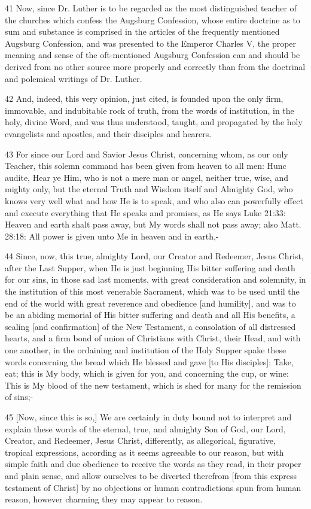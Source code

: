 41 Now, since Dr. Luther is to be regarded as the most distinguished teacher of the churches which confess the Augsburg Confession, whose entire doctrine as to sum and substance is comprised in the articles of the frequently mentioned Augsburg Confession, and was presented to the Emperor Charles V, the proper meaning and sense of the oft-mentioned Augsburg Confession can and should be derived from no other source more properly and correctly than from the doctrinal and polemical writings of Dr. Luther.

42 And, indeed, this very opinion, just cited, is founded upon the only firm, immovable, and indubitable rock of truth, from the words of institution, in the holy, divine Word, and was thus understood, taught, and propagated by the holy evangelists and apostles, and their disciples and hearers.

43 For since our Lord and Savior Jesus Christ, concerning whom, as our only Teacher, this solemn command has been given from heaven to all men: Hunc audite, Hear ye Him, who is not a mere man or angel, neither true, wise, and mighty only, but the eternal Truth and Wisdom itself and Almighty God, who knows very well what and how He is to speak, and who also can powerfully effect and execute everything that He speaks and promises, as He says Luke 21:33: Heaven and earth shalt pass away, but My words shall not pass away; also Matt. 28:18: All power is given unto Me in heaven and in earth,-

44 Since, now, this true, almighty Lord, our Creator and Redeemer, Jesus Christ, after the Last Supper, when He is just beginning His bitter suffering and death for our sins, in those sad last moments, with great consideration and solemnity, in the institution of this most venerable Sacrament, which was to be used until the end of the world with great reverence and obedience [and humility], and was to be an abiding memorial of His bitter suffering and death and all His benefits, a sealing [and confirmation] of the New Testament, a consolation of all distressed hearts, and a firm bond of union of Christians with Christ, their Head, and with one another, in the ordaining and institution of the Holy Supper spake these words concerning the bread which He blessed and gave [to His disciples]: Take, eat; this is My body, which is given for you, and concerning the cup, or wine: This is My blood of the new testament, which is shed for many for the remission of sins;-

45 [Now, since this is so,] We are certainly in duty bound not to interpret and explain these words of the eternal, true, and almighty Son of God, our Lord, Creator, and Redeemer, Jesus Christ, differently, as allegorical, figurative, tropical expressions, according as it seems agreeable to our reason, but with simple faith and due obedience to receive the words as they read, in their proper and plain sense, and allow ourselves to be diverted therefrom [from this express testament of Christ] by no objections or human contradictions spun from human reason, however charming they may appear to reason.

